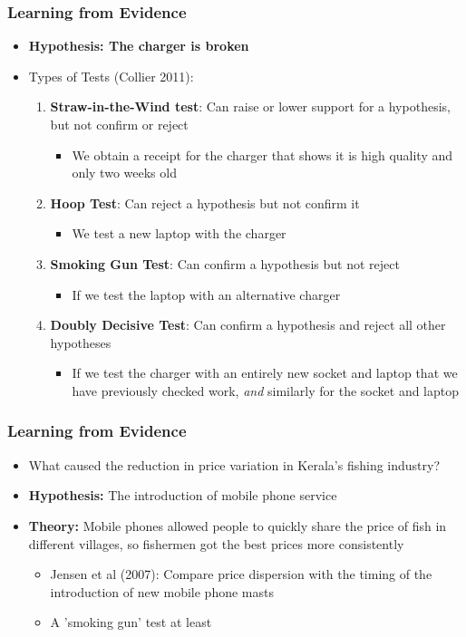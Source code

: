 \documentclass[xcolor=x11names,compress]{beamer}\usepackage[]{graphicx}\usepackage[]{xcolor}
\renewcommand{\(}{\begin{columns}}
\renewcommand{\)}{\end{columns}}
\newcommand{\<}[1]{\begin{column}{#1}}
\renewcommand{\>}{\end{column}}
\begin{document}
\begin{frame}
\frametitle{Learning from Evidence}
\begin{itemize}
\item \textbf{Hypothesis: The charger is broken}
\pause
\item Types of Tests (Collier 2011):
\pause
\begin{enumerate}
\item \textbf{Straw-in-the-Wind test}: Can raise or lower support for a hypothesis, but not confirm or reject
\pause
\begin{itemize}
\item We obtain a receipt for the charger that shows it is high quality and only two weeks old
\end{itemize}
\pause
\item \textbf{Hoop Test}: Can reject a hypothesis but not confirm it
\pause
\begin{itemize}
\item We test a new laptop with the charger
\end{itemize}
\pause
\item \textbf{Smoking Gun Test}: Can confirm a hypothesis but not reject
\pause
\begin{itemize}
\item If we test the laptop with an alternative charger
\end{itemize}
\pause
\item \textbf{Doubly Decisive Test}: Can confirm a hypothesis and reject all other hypotheses
\pause
\begin{itemize}
\item If we test the charger with an entirely new socket and laptop that we have previously checked work, \textit{and} similarly for the socket and laptop
\end{itemize}
\end{enumerate}
\end{itemize}
\end{frame}

\begin{frame}
\frametitle{Learning from Evidence}
\begin{itemize}
\item What caused the reduction in price variation in Kerala's fishing industry?
\pause
\item \textbf{Hypothesis:} The introduction of mobile phone service
\pause
\item \textbf{Theory:} Mobile phones allowed people to quickly share the price of fish in different villages, so fishermen got the best prices more consistently
\begin{itemize}
\item Jensen et al (2007): Compare price dispersion with the timing of the introduction of new mobile phone masts
\item A 'smoking gun' test at least
\end{itemize}
\end{itemize}
\end{frame}
\end{document}
